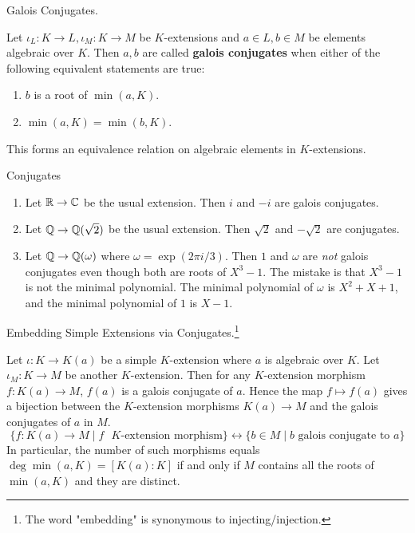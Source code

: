 \documentclass[../book.tex]{subfiles}
\begin{document}
\begin{dfn} Galois Conjugates.

    Let $\iota_L : K \to L, \iota_M : K \to M$ be $K$-extensions and
    $a \in L, b \in M$ be elements algebraic over $K$. 
    Then $a, b$ are called \textbf{galois conjugates} when
    either of the following equivalent statements are true: 
    \begin{enumerate}
        \item $b$ is a root of $\min(a,K)$.
        \item $\min(a,K) = \min(b,K)$.
    \end{enumerate}
    This forms an equivalence relation on algebraic elements in $K$-extensions.
\end{dfn}
\begin{eg} Conjugates
    \begin{enumerate}
        \item Let $\mathbb{R} \to \mathbb{C}$ be the usual extension.
        Then $i$ and $-i$ are galois conjugates.
        \item Let $\mathbb{Q} \to \mathbb{Q}(\sqrt{2})$ be the usual extension.
        Then $\sqrt{2}$ and $-\sqrt{2}$ are conjugates.
        \item Let $\mathbb{Q} \to \mathbb{Q}(\omega)$ where $\omega = \exp(2\pi i / 3)$.
        Then $1$ and $\omega$ are \emph{not} galois conjugates even though
        both are roots of $X^3 - 1$. 
        The mistake is that $X^3 - 1$ is not the minimal polynomial.
        The minimal polynomial of $\omega$ is $X^2 + X + 1$,
        and the minimal polynomial of $1$ is $X-1$.
    \end{enumerate}
\end{eg}
\begin{lem} Embedding Simple Extensions via Conjugates.\footnote{
    The word "embedding" is synonymous to injecting/injection.}
    
    Let $\iota : K \to K(a)$ be a simple $K$-extension
    where $a$ is algebraic over $K$. 
    Let $\iota_M : K \to M$ be another $K$-extension.
    Then for any $K$-extension morphism $f : K(a) \to M$, 
    $f(a)$ is a galois conjugate of $a$.
    Hence the map $f \mapsto f(a)$ gives a bijection between
    the $K$-extension morphisms $K(a) \to M$ and the galois conjugates of $a$ in $M$.
    \[
        \{f : K(a) \to M \mid f \text{ $K$-extension morphism} \} \leftrightarrow 
        \{b \in M \mid b \text{ galois conjugate to } a \}
    \]
    In particular, the number of such morphisms equals $\deg \min(a,K) = [K(a) : K]$ 
    if and only if $M$ contains all the roots of $\min(a,K)$ and they are distinct. 
\end{lem}
\end{document}
